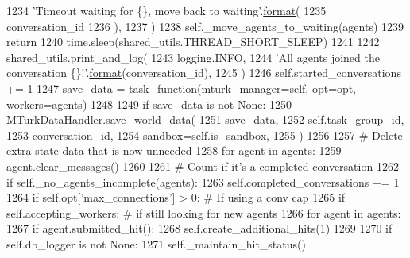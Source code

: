 \begin{DoxyCode}
1234                         \textcolor{stringliteral}{'Timeout waiting for \{\}, move back to waiting'}.\hyperlink{namespaceparlai_1_1chat__service_1_1services_1_1messenger_1_1shared__utils_a32e2e2022b824fbaf80c747160b52a76}{format}(
1235                             conversation\_id
1236                         ),
1237                     )
1238                     self.\_move\_agents\_to\_waiting(agents)
1239                     \textcolor{keywordflow}{return}
1240                 time.sleep(shared\_utils.THREAD\_SHORT\_SLEEP)
1241 
1242             shared\_utils.print\_and\_log(
1243                 logging.INFO,
1244                 \textcolor{stringliteral}{'All agents joined the conversation \{\}!'}.\hyperlink{namespaceparlai_1_1chat__service_1_1services_1_1messenger_1_1shared__utils_a32e2e2022b824fbaf80c747160b52a76}{format}(conversation\_id),
1245             )
1246             self.started\_conversations += 1
1247             save\_data = task\_function(mturk\_manager=self, opt=opt, workers=agents)
1248 
1249             \textcolor{keywordflow}{if} save\_data \textcolor{keywordflow}{is} \textcolor{keywordflow}{not} \textcolor{keywordtype}{None}:
1250                 MTurkDataHandler.save\_world\_data(
1251                     save\_data,
1252                     self.task\_group\_id,
1253                     conversation\_id,
1254                     sandbox=self.is\_sandbox,
1255                 )
1256 
1257             \textcolor{comment}{# Delete extra state data that is now unneeded}
1258             \textcolor{keywordflow}{for} agent \textcolor{keywordflow}{in} agents:
1259                 agent.clear\_messages()
1260 
1261             \textcolor{comment}{# Count if it's a completed conversation}
1262             \textcolor{keywordflow}{if} self.\_no\_agents\_incomplete(agents):
1263                 self.completed\_conversations += 1
1264             \textcolor{keywordflow}{if} self.opt[\textcolor{stringliteral}{'max\_connections'}] > 0:  \textcolor{comment}{# If using a conv cap}
1265                 \textcolor{keywordflow}{if} self.accepting\_workers:  \textcolor{comment}{# if still looking for new agents}
1266                     \textcolor{keywordflow}{for} agent \textcolor{keywordflow}{in} agents:
1267                         \textcolor{keywordflow}{if} agent.submitted\_hit():
1268                             self.create\_additional\_hits(1)
1269 
1270         \textcolor{keywordflow}{if} self.db\_logger \textcolor{keywordflow}{is} \textcolor{keywordflow}{not} \textcolor{keywordtype}{None}:
1271             self.\_maintain\_hit\_status()

\end{DoxyCode}
